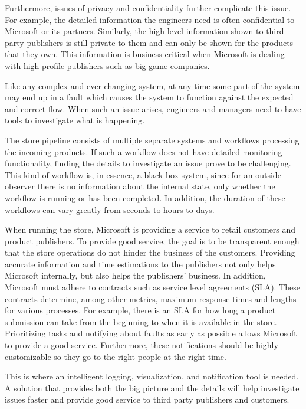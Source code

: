 Furthermore, issues of privacy and confidentiality further complicate this issue.
For example, the detailed information the engineers need is often confidential to Microsoft or its partners.
Similarly, the high-level information shown to third party publishers is still private to them 
and can only be shown for the products that they own.
This information is business-critical when Microsoft is dealing with high profile publishers such as big game companies.

Like any complex and ever-changing system, at any time some part of the system may end up in a fault
which causes the system to function against the expected and correct flow.
When such an issue arises, engineers and managers need to have tools to investigate what is happening. 

The store pipeline consists of multiple separate systems and workflows processing the incoming products.
If such a workflow does not have detailed monitoring functionality, 
finding the details to investigate an issue prove to be challenging.
This kind of workflow is, in essence, a black box system, since for an outside observer there is no information
about the internal state, only whether the workflow is running or has been completed.
In addition, the duration of these workflows can vary greatly from seconds to hours to days. 

When running the store, Microsoft is providing a service to retail customers and product publishers.
To provide good service, the goal is to be transparent enough that the store operations do not hinder the
business of the customers. Providing accurate information and time estimations to the publishers
not only helps Microsoft internally, but also helps the publishers' business.
In addition, Microsoft must adhere to contracts such as
service level agreements (SLA). These contracts determine, among other metrics, 
maximum response times and lengths for various processes.
For example, there is an SLA for how long a product submission can take from the beginning to when it is available in the store.
Prioritizing tasks and notifying about faults as early as possible allows Microsoft to provide a good service. 
Furthermore, these notifications should be highly customizable so they go to the right people at the right time.

This is where an intelligent logging, visualization, and notification tool is needed. 
A solution that provides both the big picture and the details will help investigate issues faster and
provide good service to third party publishers and customers.

